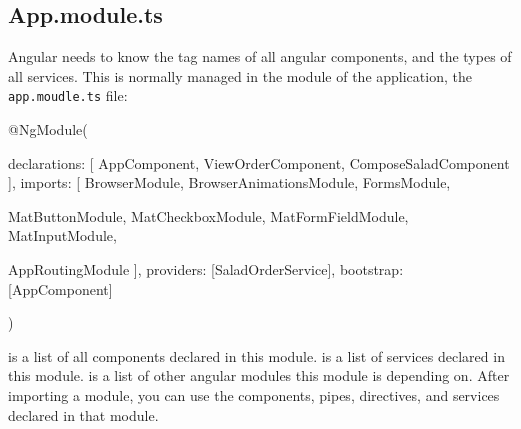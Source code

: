 \begin{itemize}

\section{App.module.ts}
Angular needs to know the tag names of all angular components, and the types of all services. This is normally managed in the module of the application, the \texttt{app.moudle.ts} file:
\begin{Code}
@NgModule({
  declarations: [
    AppComponent,
    ViewOrderComponent,
    ComposeSaladComponent
  ],
  imports: [
    BrowserModule,
    BrowserAnimationsModule,
    FormsModule,

    MatButtonModule,
    MatCheckboxModule,
    MatFormFieldModule,
    MatInputModule,

    AppRoutingModule
  ],
  providers: [SaladOrderService],
  bootstrap: [AppComponent]
})
\end{Code}
 is a list of all components declared in this module.  is a list of services declared in this module.  is a list of other angular modules this module is depending on. After importing a module, you can use the components, pipes,  directives, and services declared in that module.
\end{itemize}

